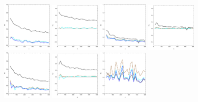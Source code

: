 \documentclass[
twoside,
openright,
titlepage,
numbers=noenddot,
headinclude,%
footinclude=true,
dottedtoc, %
ngerman,
american, %
pagesize=pdftex,
]{book}
\begin{document}
\begin{example}
\begin{figure}[H]
			\includegraphics[width=0.22\textwidth]{figures/2DTVexamples/e2l1}
			\includegraphics[width=0.22\textwidth]{figures/2DTVexamples/e2l2}
			\includegraphics[width=0.22\textwidth]{figures/2DTVexamples/e2sn1}
			\includegraphics[width=0.22\textwidth]{figures/2DTVexamples/e2sn2}
			\includegraphics[width=0.22\textwidth]{figures/2DTVexamples/e2n+l1}
			\includegraphics[width=0.22\textwidth]{figures/2DTVexamples/e2n+l2}
			\includegraphics[width=0.22\textwidth]{figures/2DTVexamples/e2sn+t1}

\end{figure}
\end{example}
\end{document}
